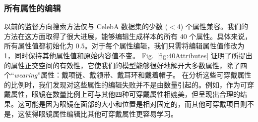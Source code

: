 \subsubsection{所有属性的编辑}
以前的监督方向搜索方法仅与 CelebA 数据集的少数 ($<$4) 个属性兼容。我们的方法在这方面取得了很大进展，能够编辑生成样本的所有 40 个属性。具体来说，所有属性值都初始化为 $0.5$。对于每个属性编辑，我们只需将编辑属性值修改为1，同时保持其他属性值和原始内容值不变。 Fig.~\ref{fig:40Attributes} 证明了所提出的属性正交空间的有效性，它使我们的模型能够很好地解开大多数属性，除了四个“\textit{wearing}”属性：戴项链、戴领带、戴耳环和戴着帽子。
在分析这些可穿戴属性的比例时，我们发现对这些属性的编辑失败并不是由数量引起的。例如，作为可穿戴属性，眼镜在数量比例上可与其他四种可穿戴属性相媲美，但呈现出合理的结果。这可能是因为眼镜在面部的大小和位置是相对固定的，而其他可穿戴项目则不是，这使得眼镜属性编辑比其他可穿戴属性更容易学习。


